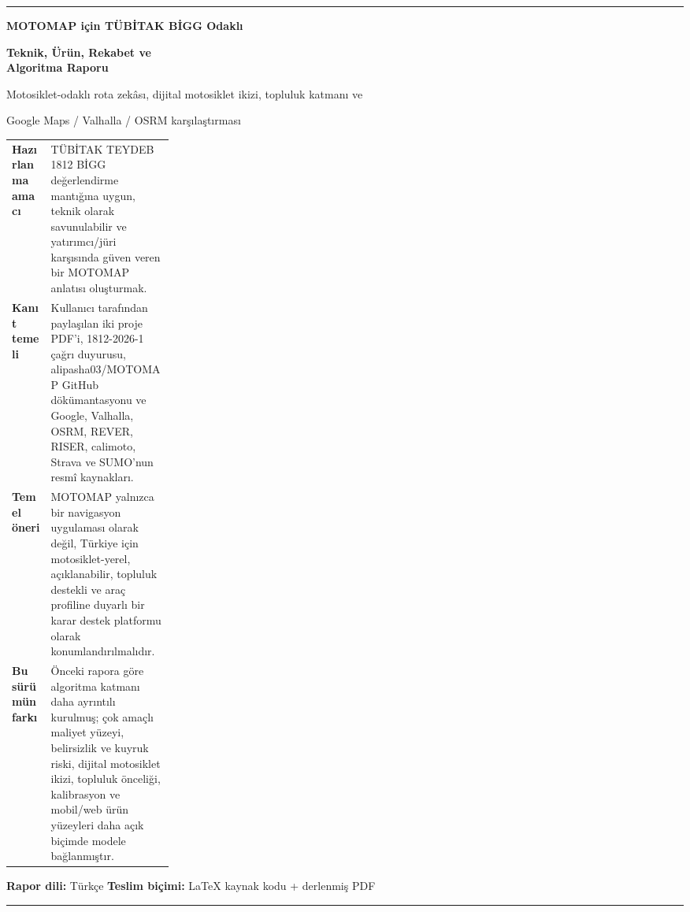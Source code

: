 \documentclass[11pt,a4paper]{article}
\begin{document}
\begin{titlepage}
\thispagestyle{empty}
\vspace*{1.8cm}
{\color{accent}\rule{\linewidth}{1.2pt}}
\vspace{0.8cm}

{\Huge\bfseries MOTOMAP için TÜBİTAK BİGG Odaklı\par}
\vspace{0.25cm}
{\Huge\bfseries Teknik, Ürün, Rekabet ve\\ Algoritma Raporu\par}

\vspace{0.8cm}
{\Large Motosiklet-odaklı rota zekâsı, dijital motosiklet ikizi, topluluk katmanı ve\par}
{\Large Google Maps / Valhalla / OSRM karşılaştırması\par}

\vspace{1.1cm}
\begin{tabularx}{\linewidth}{>{\bfseries}p{0.24\linewidth}Y}
Hazırlanma amacı & TÜBİTAK TEYDEB 1812 BİGG değerlendirme mantığına uygun, teknik olarak savunulabilir ve yatırımcı/jüri karşısında güven veren bir MOTOMAP anlatısı oluşturmak. \\
Kanıt temeli & Kullanıcı tarafından paylaşılan iki proje PDF'i, 1812-2026-1 çağrı duyurusu, alipasha03/MOTOMAP GitHub dökümantasyonu ve Google, Valhalla, OSRM, REVER, RISER, calimoto, Strava ve SUMO'nun resmî kaynakları. \\
Temel öneri & MOTOMAP yalnızca bir navigasyon uygulaması olarak değil, Türkiye için motosiklet-yerel, açıklanabilir, topluluk destekli ve araç profiline duyarlı bir karar destek platformu olarak konumlandırılmalıdır. \\
Bu sürümün farkı & Önceki rapora göre algoritma katmanı daha ayrıntılı kurulmuş; çok amaçlı maliyet yüzeyi, belirsizlik ve kuyruk riski, dijital motosiklet ikizi, topluluk önceliği, kalibrasyon ve mobil/web ürün yüzeyleri daha açık biçimde modele bağlanmıştır. \\
\end{tabularx}

\vfill
\begin{center}
{\large \textbf{Rapor dili:} Türkçe \hspace{1.2cm} \textbf{Teslim biçimi:} LaTeX kaynak kodu + derlenmiş PDF}\par
\vspace{0.7cm}
{\color{accent}\rule{\linewidth}{1.2pt}}
\end{center}
\end{titlepage}
\end{document}
